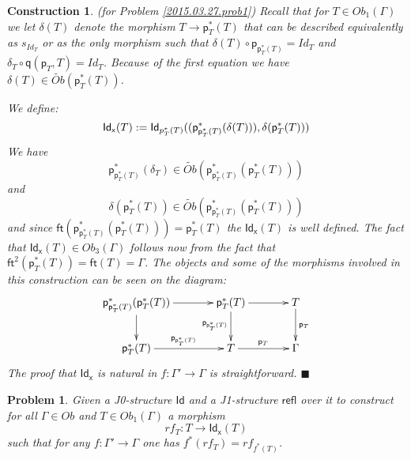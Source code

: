 \documentclass[12pt]{article}
\numberwithin{equation}{section}
\newenvironment{eq}{\begin{equation}}{\end{equation}}
\newtheorem{problem}[proposition]{Problem}
\newtheorem{construction0}[proposition]{Construction}
\newenvironment{construction}[1]{\begin{construction0}(for Problem \ref{#1})}{$\blacksquare$ \end{construction0}}
\newcommand{\llabel}[1]{\label{#1}}
\newcommand{\sr}{\rightarrow}
\newcommand{\wt}{\widetilde}
\newcommand{\ft}{\mathsf{ft}}
\newcommand{\p}{\mathsf{p}}
\newcommand{\q}{\mathsf{q}}
\newcommand{\Id}{\mathsf{Id}} %
\newcommand{\refl}{\mathsf{refl}}
\newcommand{\Idx}{\mathsf{Id_x}} %
\begin{document}
\begin{construction}{2015.03.27.prob1}
\llabel{2015.03.27.constr1}\rm Recall that for $T\in Ob_1(\Gamma)$ we let
$\delta(T)$ denote the morphism $T\sr \p_T^*(T)$ that can be described
equivalently as $s_{Id_T}$ or as the only morphism such that $\delta(T)\circ
\p_{\p_T^*(T)}=Id_T$ and $\delta_T\circ \q(\p_T,T)=Id_T$. Because of the first
equation we have $\delta(T)\in \wt{Ob}(\p_T^*(T))$.

We define:
%
\begin{eq}
\llabel{2015.04.06.eq1}
\Idx(T):=\Id_{\\p_T^*(T)}((\p_{\p_T^*(T)}^*(\delta(T))), \delta(\p_T^*(T)))
\end{eq}
%
We have
%
$$\p_{\p_T^*(T)}^*(\delta_T)\in \wt{Ob}(\p_{\p_T^*(T)}^*(\p_T^*(T)))$$
%
and
%
$$\delta(\p_T^*(T))\in \wt{Ob}(\p_{\p_T^*(T)}^*(\p_T^*(T)))$$
%
and since $\ft(\p_{\p_T^*(T)}^*(\p_T^*(T)))=\p_T^*(T)$ the $\Idx(T)$ is well
defined. The fact that $\Idx(T)\in Ob_3(\Gamma)$ follows now from the fact that
$\ft^2(\p_T^*(T))=\ft(T)=\Gamma$. The objects and some of the morphisms involved
in this construction can be seen on the diagram:
%
$$
\begin{xy}
          \xymatrix@C=3pc{ \p_{\p_T^*(T)}^*(\p_T^*(T)) \ar[r] \ar[d]& \p_T^*(T)
            \ar[r] \ar[d]_{\p_{\p_T^*(T)}} & T \ar[d]^{\p_T}\\ \p_T^*(T)
            \ar[r]^{\p_{\p_T^*(T)}} & T \ar[r]^{\p_T} & \Gamma }
\end{xy}
$$
%
The proof that $\Idx$ is natural in $f:\Gamma'\sr \Gamma$ is straightforward.
\end{construction}
%
%
\begin{problem}
\llabel{2015.03.27.prob2} Given a J0-structure $\Id$ and a J1-structure $\refl$
over it to construct for all $\Gamma\in Ob$ and $T\in Ob_1(\Gamma)$ a morphism
%
$$rf_T:T\sr \Idx(T)$$
%
such that for any $f:\Gamma'\sr \Gamma$ one has $f^*(rf_T)=rf_{f^*(T)}$.
\end{problem}
%
\end{document}
